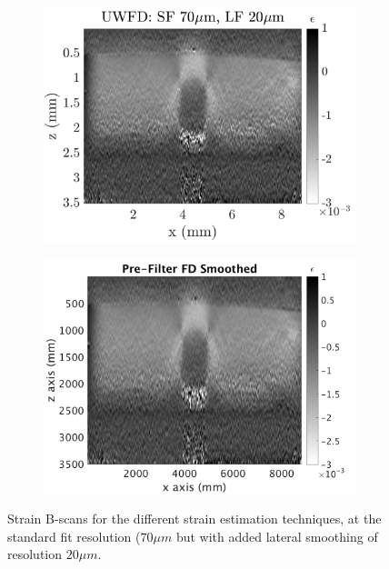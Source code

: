 \begin{figure}[h]
\begin{subfigure}{0.49\textwidth}
        \includegraphics[width=\textwidth]{appendix_figs/uwfd_fr70_lr20.png}
    \end{subfigure}
    \begin{subfigure}{0.49\textwidth}
    	\centering
        \includegraphics[width=\textwidth]{appendix_figs/fdsm_fr70_lr20.png}
    \end{subfigure}    
    \label{images_low_fitres}
    \caption{Strain B-scans for the different strain estimation techniques, at the standard fit resolution ($70 \mu m$ but with added lateral smoothing of resolution $20 \mu m$.}
\end{figure}

